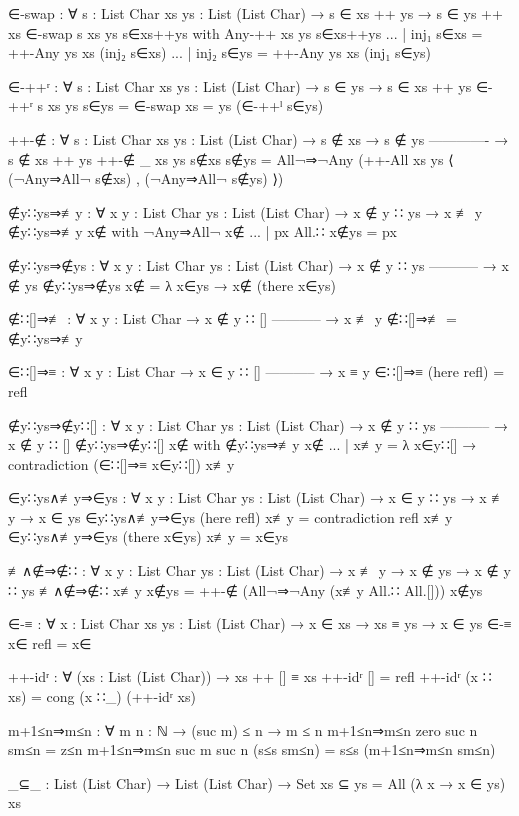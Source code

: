 \begin{code}
  ∈-swap : ∀ {s : List Char} {xs ys : List (List Char)}
    → s ∈ xs ++ ys
    → s ∈ ys ++ xs
  ∈-swap {s} {xs} {ys} s∈xs++ys with Any-++ xs ys s∈xs++ys
  ... | inj₁ s∈xs = ++-Any ys xs (inj₂ s∈xs)
  ... | inj₂ s∈ys = ++-Any ys xs (inj₁ s∈ys)

  ∈-++ʳ : ∀ {s : List Char} {xs ys : List (List Char)}
    → s ∈ ys
    → s ∈ xs ++ ys
  ∈-++ʳ {s} {xs} {ys} s∈ys = ∈-swap {xs = ys} (∈-++ˡ s∈ys)

  ++-∉ : ∀ {s : List Char} {xs ys : List (List Char)}
    → s ∉ xs
    → s ∉ ys
      -------------
    → s ∉ xs ++ ys
  ++-∉ {_} {xs} {ys} s∉xs s∉ys = All¬⇒¬Any
    (++-All xs ys ⟨ (¬Any⇒All¬ s∉xs) , (¬Any⇒All¬ s∉ys) ⟩)

  ∉y∷ys⇒≢y : ∀ {x y : List Char} {ys : List (List Char)}
    → x ∉ y ∷ ys
    → x ≢ y
  ∉y∷ys⇒≢y x∉ with ¬Any⇒All¬ x∉
  ... | px All.∷ x∉ys = px

  ∉y∷ys⇒∉ys : ∀ {x y : List Char} {ys : List (List Char)}
    → x ∉ y ∷ ys
      -----------
    → x ∉ ys
  ∉y∷ys⇒∉ys x∉ = λ x∈ys → x∉ (there x∈ys)

  ∉∷[]⇒≢ : ∀ {x y : List Char}
    → x ∉ y ∷ []
      -----------
    → x ≢ y
  ∉∷[]⇒≢ = ∉y∷ys⇒≢y

  ∈∷[]⇒≡ : ∀ {x y : List Char}
    → x ∈ y ∷ []
      -----------
    → x ≡ y
  ∈∷[]⇒≡ (here refl) = refl

  ∉y∷ys⇒∉y∷[] : ∀ {x y : List Char} {ys : List (List Char)}
    → x ∉ y ∷ ys
      -----------
    → x ∉ y ∷ []
  ∉y∷ys⇒∉y∷[] x∉ with ∉y∷ys⇒≢y x∉
  ... | x≢y = λ x∈y∷[] → contradiction (∈∷[]⇒≡ x∈y∷[]) x≢y

  ∈y∷ys∧≢y⇒∈ys : ∀ {x y : List Char} {ys : List (List Char)}
    → x ∈ y ∷ ys
    → x ≢ y
    → x ∈ ys
  ∈y∷ys∧≢y⇒∈ys (here refl) x≢y = contradiction refl x≢y
  ∈y∷ys∧≢y⇒∈ys (there x∈ys) x≢y = x∈ys

  ≢∧∉⇒∉∷ : ∀ {x y : List Char} {ys : List (List Char)}
    → x ≢ y
    → x ∉ ys
    → x ∉ y ∷ ys
  ≢∧∉⇒∉∷ x≢y x∉ys = ++-∉ (All¬⇒¬Any (x≢y All.∷ All.[])) x∉ys
  
  ∈-≡ : ∀ {x : List Char} {xs ys : List (List Char)}
    → x ∈ xs → xs ≡ ys → x ∈ ys
  ∈-≡ x∈ refl = x∈

  ++-idʳ : ∀ (xs : List (List Char)) → xs ++ [] ≡ xs
  ++-idʳ [] = refl
  ++-idʳ (x ∷ xs) = cong (x ∷_) (++-idʳ xs)

  m+1≤n⇒m≤n : ∀ {m n : ℕ} → (suc m) ≤ n → m ≤ n
  m+1≤n⇒m≤n {zero} {suc n} sm≤n = z≤n
  m+1≤n⇒m≤n {suc m} {suc n} (s≤s sm≤n) = s≤s (m+1≤n⇒m≤n sm≤n)

  _⊆_ : List (List Char) → List (List Char) → Set
  xs ⊆ ys = All (λ x → x ∈ ys) xs


\end{code}
